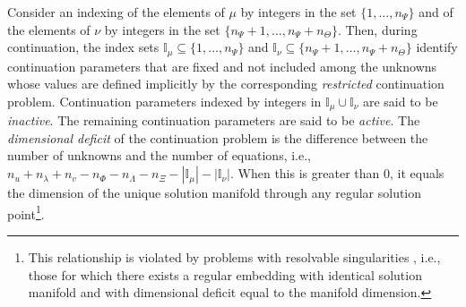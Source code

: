Consider an indexing of the elements of $\mu$ by integers in the set $\{1,\ldots,n_\Psi\}$ and of the elements of $\nu$ by integers in the set $\{n_\Psi+1,\ldots,n_\Psi+n_\Theta\}$. Then, during continuation, the index sets $\mathbb{I}_\mu\subseteq\{1,\ldots,n_\Psi\}$ and $\mathbb{I}_\nu\subseteq\{n_\Psi+1,\ldots,n_\Psi+n_\Theta\}$ identify continuation parameters that are fixed and not included among the unknowns whose values are defined implicitly by the corresponding \emph{restricted} continuation problem. Continuation parameters indexed by integers in $\mathbb{I}_\mu\cup\mathbb{I}_\nu$ are said to be \emph{inactive}. The remaining continuation parameters are said to be \emph{active}. The \emph{dimensional deficit} of the continuation problem is the difference between the number of unknowns and the number of equations, i.e., $n_u+n_\lambda+n_v-n_\Phi-n_\Lambda-n_\Xi-\left|\mathbb{I}_\mu\right|-\left|\mathbb{I}_\nu\right|$. When this is greater than $0$, it equals the dimension of the unique solution manifold through any regular solution point\footnote{This relationship is violated by problems with resolvable singularities , i.e., those for which there exists a regular embedding with identical solution manifold and with dimensional deficit equal to the manifold dimension.}.

